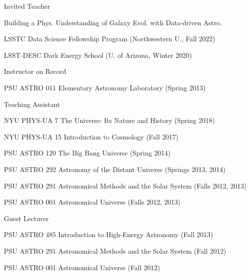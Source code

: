 \documentclass[11pt,letterpaper]{article}
\begin{document}
\begin{list}{}{\malzlist}
\item Invited Teacher
\begin{list}{}{\malzlist}
	\item Building a Phys. Understanding of Galaxy Evol. with Data-driven Astro. 
	\item LSSTC Data Science Fellowship Program (Northwestern U., Fall 2022)
	\item LSST-DESC Dark Energy School (U. of Arizona, Winter 2020)
\end{list}
\item Instructor on Record
\begin{list}{}{\malzlist}
	\item PSU ASTRO 011 Elementary Astronomy Laboratory (Spring 2013)
\end{list}
\item Teaching Assistant
\begin{list}{}{\malzlist}
	\item NYU PHYS-UA 7 The Universe: Its Nature and History (Spring 2018)
	\item NYU PHYS-UA 15 Introduction to Cosmology (Fall 2017)
	\item PSU ASTRO 120 The Big Bang Universe (Spring 2014)
	\item PSU ASTRO 292 Astronomy of the Distant Universe (Springs 2013, 2014)
	\item PSU ASTRO 291 Astronomical Methods and the Solar System (Falls 2012, 2013)
	\item PSU ASTRO 001 Astronomical Universe (Falls 2012, 2013)
\end{list}
\item Guest Lecturer
\begin{list}{}{\malzlist}
	\item PSU ASTRO 485 Introduction to High-Energy Astronomy (Fall 2013)%
	\item PSU ASTRO 291 Astronomical Methods and the Solar System (Fall 2012) %
	\item PSU ASTRO 001 Astronomical Universe (Fall 2012) %
\end{list}
\end{list}

%
\clearpage
\end{document}
